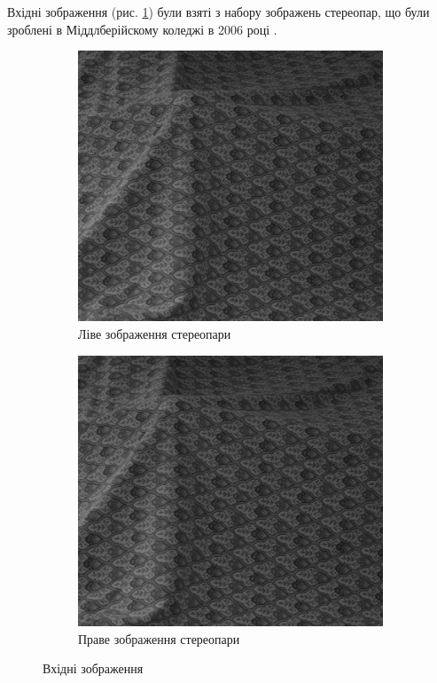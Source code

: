 
Вхідні зображення (рис. \ref{fig:stereopair}) були взяті з набору зображень стереопар,
що були зроблені в Міддлберійскому коледжі в 2006 році
\cite{middlebury:ds:1} \cite{middlebury:ds:2}.

\begin{figure}[h]
  \centering
  \begin{subfigure}[b]{0.3\textwidth}
      \includegraphics[width=\textwidth]{images/cloth_left_400}
      \caption{Ліве зображення стереопари}
  \end{subfigure}
  \begin{subfigure}[b]{0.3\textwidth}
      \includegraphics[width=\textwidth]{images/cloth_right_400}
      \caption{Праве зображення стереопари}
  \end{subfigure}
  \caption{Вхідні зображення}
  \label{fig:stereopair}
\end{figure}

